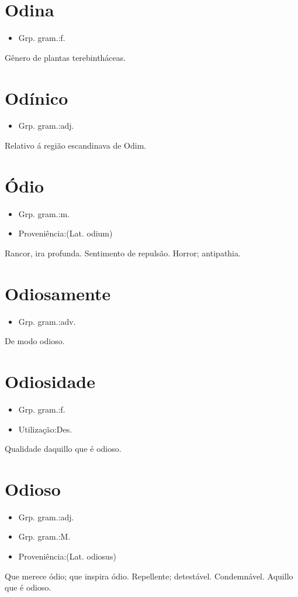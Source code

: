 \section{Odina}
\begin{itemize}
\item {Grp. gram.:f.}
\end{itemize}
Gênero de plantas terebintháceas.
\section{Odínico}
\begin{itemize}
\item {Grp. gram.:adj.}
\end{itemize}
Relativo á região escandinava de Odim.
\section{Ódio}
\begin{itemize}
\item {Grp. gram.:m.}
\end{itemize}
\begin{itemize}
\item {Proveniência:(Lat. \textunderscore odium\textunderscore )}
\end{itemize}
Rancor, ira profunda.
Sentimento de repulsão.
Horror; antipathia.
\section{Odiosamente}
\begin{itemize}
\item {Grp. gram.:adv.}
\end{itemize}
De modo odioso.
\section{Odiosidade}
\begin{itemize}
\item {Grp. gram.:f.}
\end{itemize}
\begin{itemize}
\item {Utilização:Des.}
\end{itemize}
Qualidade daquillo que é odioso.
\section{Odioso}
\begin{itemize}
\item {Grp. gram.:adj.}
\end{itemize}
\begin{itemize}
\item {Grp. gram.:M.}
\end{itemize}
\begin{itemize}
\item {Proveniência:(Lat. \textunderscore odiosus\textunderscore )}
\end{itemize}
Que merece ódio; que inspira ódio.
Repellente; detestável.
Condemnável.
Aquillo que é odioso.
